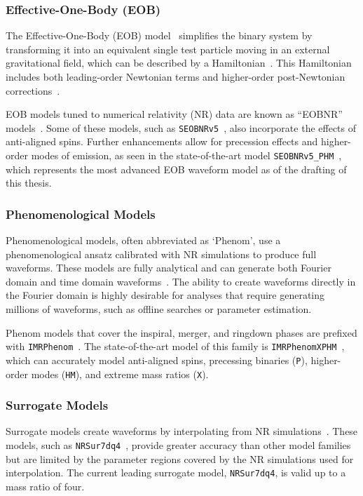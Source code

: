 \subsubsection{Effective-One-Body (EOB)}

The Effective-One-Body (EOB) model~\cite{EOB_1:1998} simplifies the binary system by transforming it into an equivalent single test particle moving in an external gravitational field, which can be described by a Hamiltonian~\cite{EOB_1:1998, EOB_2:2000, EOB_3:2000, EOB_4:2001}. This Hamiltonian includes both leading-order Newtonian terms and higher-order post-Newtonian corrections~\cite{EOB_5:2008}.

EOB models tuned to numerical relativity (NR) data are known as ``EOBNR'' models~\cite{EOB_6:2007}. Some of these models, such as \verb|SEOBNRv5|~\cite{SEOBNRv5:2023tna}, also incorporate the effects of anti-aligned spins. Further enhancements allow for precession effects and higher-order modes of \gwadj emission, as seen in the state-of-the-art model \verb|SEOBNRv5_PHM|~\cite{SEOBNRv5_PHM-Buades:2023ehm}, which represents the most advanced EOB waveform model as of the drafting of this thesis.

\subsubsection{Phenomenological Models}

Phenomenological models, often abbreviated as `Phenom', use a phenomenological ansatz calibrated with NR simulations to produce full waveforms. These models are fully analytical and can generate both Fourier domain and time domain waveforms~\cite{IMR_1:2007, IMR_2:2020}. The ability to create waveforms directly in the Fourier domain is highly desirable for analyses that require generating millions of waveforms, such as offline searches or parameter estimation.

Phenom models that cover the inspiral, merger, and ringdown phases are prefixed with \verb|IMRPhenom|~\cite{IMRPhenomD:2009}. The state-of-the-art model of this family is \verb|IMRPhenomXPHM|~\cite{IMRPhenomXPHM:2020}, which can accurately model anti-aligned spins, precessing binaries (\verb|P|), higher-order modes (\verb|HM|), and extreme mass ratios (\verb|X|).

\subsubsection{Surrogate Models}

Surrogate models create waveforms by interpolating from NR simulations~\cite{Surr_1:2019, Surr_2:2022}. These models, such as \verb|NRSur7dq4|~\cite{NRSur7dq4:2019}, provide greater accuracy than other model families but are limited by the parameter regions covered by the NR simulations used for interpolation. The current leading surrogate model, \verb|NRSur7dq4|, is valid up to a mass ratio of four.
